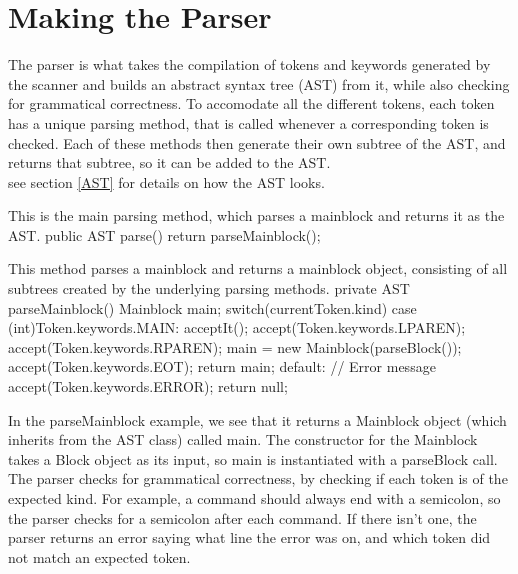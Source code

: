 \section{Making the Parser}
The parser is what takes the compilation of tokens and keywords generated by the scanner and builds an abstract syntax tree (AST) from it, while also checking for grammatical correctness.
To accomodate all the different tokens, each token has a unique parsing method, that is called whenever a corresponding token is checked.
Each of these methods then generate their own subtree of the AST, and returns that subtree, so it can be added to the AST. \\
see section \ref{AST} for details on how the AST looks.

\begin{source}{}{This is the main parsing method, which parses a mainblock and returns it as the AST.}{}
public AST parse()
        {
            return parseMainblock();
        }
\end{source}
\begin{source}{}{This method parses a mainblock and returns a mainblock object, consisting of all subtrees created by the underlying parsing methods.}{}
private AST parseMainblock()
        {
            Mainblock main;
            switch(currentToken.kind)
            {
                case (int)Token.keywords.MAIN:
                    acceptIt();
                    accept(Token.keywords.LPAREN);
                    accept(Token.keywords.RPAREN);
                    main = new Mainblock(parseBlock());
                    accept(Token.keywords.EOT);
                    return main;
                default:
                    // Error message
                    accept(Token.keywords.ERROR);
                    return null;
            }
        }
\end{source}
In the parseMainblock example, we see that it returns a Mainblock object (which inherits from the AST class) called main. 
The constructor for the Mainblock takes a Block object as its input, so main is instantiated with a parseBlock call. \\
The parser checks for grammatical correctness, by checking if each token is of the expected kind. 
For example, a command should always end with a semicolon, so the parser checks for a semicolon after each command. 
If there isn't one, the parser returns an error saying what line the error was on, and which token did not match an expected token.